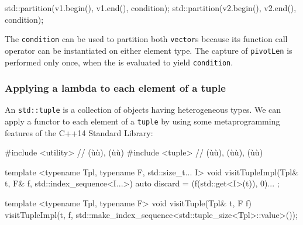{\begin{emcppslisting}
{    std::partition(v1.begin(), v1.end(), condition);
    std::partition(v2.begin(), v2.end(), condition);
}
\end{emcppslisting}
    

\noindent The \lstinline!condition!  can be used to partition
both \lstinline!vector!s because its function call operator can be
instantiated on either element type. The capture of \lstinline!pivotLen! is
performed only once, when the  is evaluated to
yield \lstinline!condition!.

\subsubsection[Applying a lambda to each element of a tuple]{Applying a lambda to each element of a tuple}\label{applying-a-lambda-to-each-element-of-a-tuple}

An \lstinline!std::tuple! is a collection of objects having heterogeneous
types. We can apply a functor to each element of a \lstinline!tuple! by
using some metaprogramming features of the C++14 Standard Library:

\begin{emcppslisting}
#include <utility>  // (ù{}ù), (ù{}ù)
#include <tuple>    // (ù{}ù), (ù{}ù), (ù{}ù)

template <typename Tpl, typename F, std::size_t... I>
void visitTupleImpl(Tpl& t, F& f, std::index_sequence<I...>)
{
    auto discard = { (f(std::get<I>(t)), 0)... };
}

template <typename Tpl, typename F>
void visitTuple(Tpl& t, F f)
{
    visitTupleImpl(t, f,
                   std::make_index_sequence<std::tuple_size<Tpl>::value>());
}
\end{emcppslisting}
    

}
